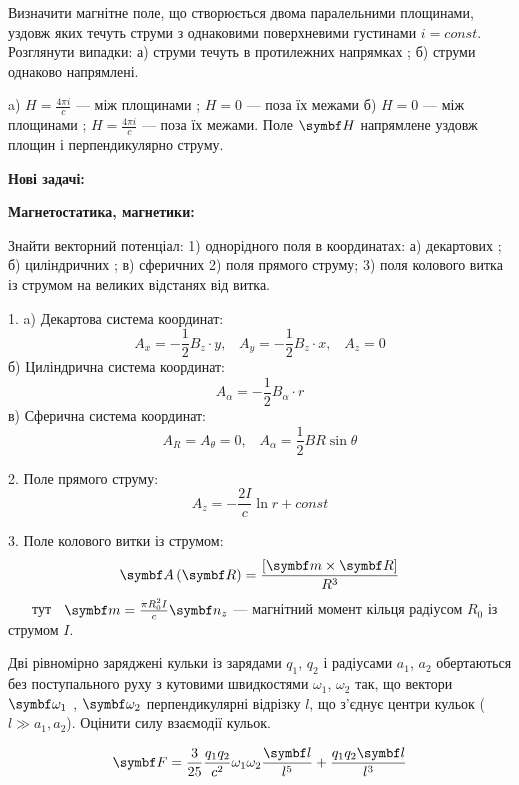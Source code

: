 \documentclass[]{ProblemBook}
\begin{document}
\begin{problem}
Визначити магнітне поле, що створюється двома паралельними площинами, уздовж яких течуть струми з однаковими поверхневими густинами $i = const$. Розглянути випадки: а) струми течуть в протилежних напрямках ;  б) струми однаково напрямлені.    
	\begin{solution}
a)	$H=\frac{4\pi i}{c}$ --- між площинами ; $H=0$ --- поза їх межами
б) $H=0$ --- між площинами ;  $H=\frac{4\pi i}{c}$ --- поза їх межами.
Поле $\Hfield$ напрямлене уздовж площин і перпендикулярно струму. 
\end{solution}
\end{problem}

{\bf \textcolor[rgb]{0.6,0.0,0.1}{Нові задачі:}}

{\bf {Магнетостатика, магнетики:}}

\begin{problem}
 Знайти векторний потенціал: 1) однорідного поля в координатах:
а) декартових ; б) циліндричних ; в) сферичних
2) поля прямого струму;  3) поля колового витка із струмом на великих відстанях від витка.   
	\begin{solution}

1. a) Декартова система координат: 
\[A_x = -\frac{1}{2}B_z\cdot y ,\;\;\; A_y=-\frac{1}{2}B_z\cdot x ,\;\;\; A_z = 0\]
б) Циліндрична система координат:
\[A_{\alpha} = -\frac{1}{2}B_{\alpha}\cdot r\]
в) Сферична система координат:
\[A_R = A_\theta = 0,\;\;\;  A_\alpha = \frac{1}{2}BR\sin\theta\]

2. Поле прямого струму:
\[A_z = -\frac{2I}{c}\ln r + const\]

3. Поле колового витки із струмом:
\[\vect{A}\left(\vect{R}\right)=\frac{\left[\vect{m} \times \vect{R}\right]}{R^3}\]
$\;\;\;\;\;$ тут $\;\;\vect{m}=\frac{\pi R^2_0 I}{c}\vect{n}_z$ --- магнітний момент кільця радіусом $R_0$ із струмом $I$.
\end{solution}
\end{problem}

\begin{problem}
 Дві рівномірно заряджені кульки із зарядами $q_1$, $q_2$ і радіусами $a_1$, $a_2$ обертаються без поступального руху з кутовими швидкостями $\omega_1$, $\omega_2$ так, що вектори $\vect{\omega}_1$ , $\vect{\omega}_2$ перпендикулярні відрізку $l$, що з’єднує центри кульок ($l \gg a_1,a_2$). Оцінити силу взаємодії кульок. 
	\begin{solution}
\[\vect{F}=\frac{3}{25}\frac{q_1 q_2}{c^2}\omega_1 \omega_2 \frac{\vect{l}}{l^5}+\frac{q_1 q_2\vect{l}}{l^3}\]

\end{solution}
\end{problem}
\end{document}
